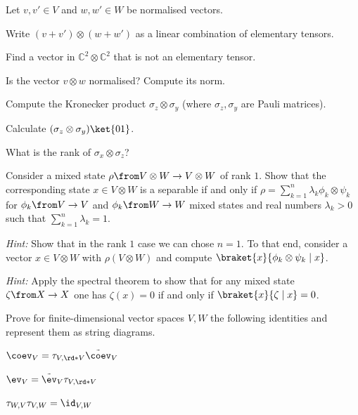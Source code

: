 \documentclass[a4paper,oneside, 12pt]{amsart}
\begin{document}
\begin{exercise}
  Let \(v, v' \in V\) and \(w, w'\in W\) be normalised vectors.
  \begin{thmlist}
    \item Write \((v + v') \otimes (w + w')\) as a linear combination of elementary tensors.
    \item Find a vector in \( \mathbb{C}^{2} \otimes \mathbb{C}^{2}\) that is not an elementary tensor.
    \item Is the vector \(v \otimes w\) normalised?
    Compute its norm.
    \item Compute the Kronecker product \(\sigma_{z} \otimes \sigma_{y}\) (where \(\sigma_{z}, \sigma_{y}\) are Pauli matrices).
    \item Calculate \((\sigma_{z} \otimes \sigma_{y}) \ket{01}\).
    \item What is the rank of \(\sigma_{x}\otimes \sigma_{z}\)?
  \end{thmlist}
\end{exercise}

\begin{exercise}
  Consider a mixed state \(\rho \from V\otimes W \to V\otimes W\) of rank \(1\).
  Show that the corresponding state \(x \in V\otimes W\) is a separable if and only if \(\rho = \sum_{k=1}^{n} \lambda_{k} \phi_{k} \otimes \psi_{k}\) for \(\phi_{k} \from V\to V\) and \(\phi_{k} \from W\to W\) mixed states and real numbers \(\lambda_{k} > 0\) such that \(\sum_{k=1}^{n}\lambda_{k} =1\).

  \textit{Hint:} Show that in the rank \(1\) case we can chose \(n=1\).
  To that end, consider a vector \(x \in V\otimes W\) with \(\rho(V\otimes W)\) and compute
  \(\braket{x}{\phi_{k} \otimes \psi_{k} \mid x}\).

  \textit{Hint:} Apply the spectral theorem to show that for any mixed state \(\zeta \from X \to X\) one has \(\zeta(x) = 0\) if and only if \(\braket{x}{\zeta \mid x} = 0\).
\end{exercise}

\begin{exercise}
  Prove for  finite-dimensional vector spaces \(V, W\)  the following identities and represent them as string diagrams.
  \begin{thmlist}
    \item \(\coev_{V} = \tau_{V,\rd*{V}}\tilde{\coev}_{V}\)
    \item \(\ev_{V} = \tilde{\ev}_{V}\tau_{V,\rd*{V}}\)
    \item \(\tau_{W,V}\tau_{V,W} = \id_{V,W}\)
  \end{thmlist}
\end{exercise}
\end{document}
